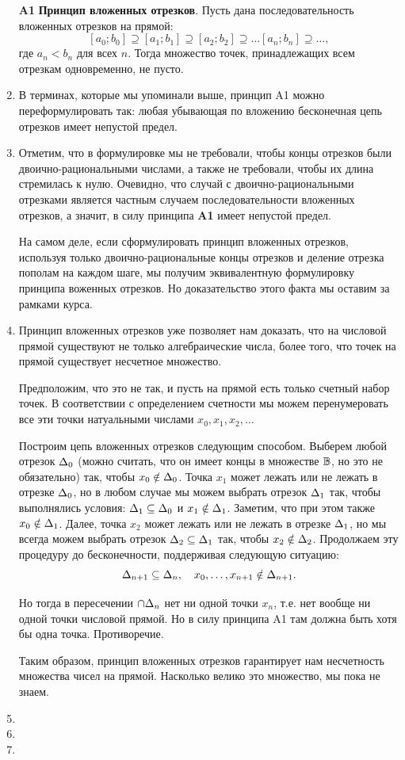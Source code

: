 \begin{enumerate}
\item[{\bf A1}] \textbf{Принцип вложенных отрезков}. Пусть дана последовательность вложенных отрезков на прямой:
$$
[a_0;b_0]\supseteq[a_1;b_1]\supseteq[a_2;b_2]\supseteq\dots[a_n;b_n]\supseteq\dots,
$$
где $a_n<b_n$ для всех $n$. Тогда множество точек, принадлежащих всем отрезкам одновременно, не пусто.
\item В терминах, которые мы упоминали выше, принцип A1 можно переформулировать так: любая убывающая по вложению бесконечная цепь отрезков имеет непустой предел.
\item Отметим, что в формулировке мы не требовали, чтобы концы отрезков были двоично-рациональными числами, а также не требовали, чтобы их длина стремилась к нулю. Очевидно, что случай с двоично-рациональными отрезками является частным случаем последовательности вложенных отрезков, а значит, в силу принципа \textbf{A1} имеет непустой предел.

На самом деле, если сформулировать принцип вложенных отрезков, используя только двоично-рациональные концы отрезков и деление отрезка пополам на каждом шаге, мы получим эквивалентную формулировку принципа воженных отрезков. Но доказательство этого факта мы оставим за рамками курса.
\item Принцип вложенных отрезков уже позволяет нам доказать, что на числовой прямой существуют не только алгебраические числа, более того, что точек на прямой существует несчетное множество.

Предположим, что это не так, и пусть на прямой есть только счетный набор точек. В соответствии с определением счетности мы можем перенумеровать все эти точки натуальными числами $x_0,x_1,x_2,\dots$

Построим цепь вложенных отрезков следующим способом. Выберем любой отрезок $\Delta_0$ (можно считать, что он имеет концы в множестве $\mathbb B$, но это не обязательно) так, чтобы $x_0\notin\Delta_0$. Точка $x_1$ может лежать или не лежать в отрезке $\Delta_0$, но в любом случае мы можем выбрать отрезок $\Delta_1$ так, чтобы выполнялись условия: $\Delta_1\subseteq\Delta_0$ и $x_1\notin\Delta_1$. Заметим, что при этом также $x_0\notin\Delta_1$. Далее, точка $x_2$ может лежать или не лежать в отрезке $\Delta_1$, но мы всегда можем выбрать отрезок $\Delta_2\subseteq\Delta_1$ так, чтобы $x_2\notin\Delta_2$. Продолжаем эту процедуру до бесконечности, поддерживая следующую ситуацию:
$$
\Delta_{n+1}\subseteq\Delta_n,\quad x_0,\dots,x_{n+1}\notin\Delta_{n+1}.
$$

Но тогда в пересечении $\cap\Delta_n$ нет ни одной точки $x_n$, т.е. нет вообще ни одной точки числовой прямой. Но в силу принципа A1 там должна быть хотя бы одна точка. Противоречие.

Таким образом, принцип вложенных отрезков гарантирует нам несчетность множества чисел на прямой. Насколько велико это множество, мы пока не знаем.
\item 
\item 
\item 



\end{enumerate}


